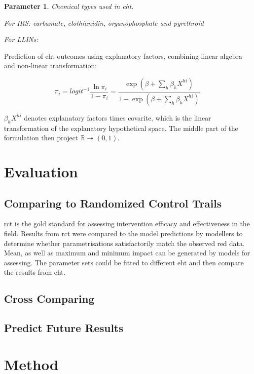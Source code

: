 \documentclass[a4paper, 12pt, twoside]{article}
\newtheorem{parameter}{Parameter}
\begin{document}
\begin{parameter}
\label{eht:chemical_class_used}
  Chemical types used in \gls{eht}.

  For IRS: carbamate, clothianidin, organophosphate and pyrethroid

  For LLINs: 
  
\end{parameter}

Prediction of \gls{eht} outcomes using explanatory factors, combining linear algebra and non-linear transformation\cite{Sherrard-Smith2018b}:

\[
  \pi_i = logit^{-1} \frac{\ln \pi_i}{1-\pi_i} = \frac{ \exp( \beta + \sum_h \beta_h X^{hi} ) }{ 1 - \exp( \beta + \sum_h \beta_h X^{hi} ) }
.\] 

$\beta_h X^{hi}$ denotes explanatory factors times covarite, which is the linear transformation of the explanatory hypothetical space. The middle part of the formulation then project $\mathbb{R} \twoheadrightarrow (0,1)$.

\section{Evaluation}
\subsection{Comparing to Randomized Control Trails}

\gls{rct} is the gold standard for assessing intervention efficacy and effectiveness in the field.
Results from \gls{rct} were compared to the model predictions by modellers to determine whether parametrisations satisfactorily match the observed red data\cite{Sherrard-Smith2018b}.
Mean, as well as maximum and minimum impact can be generated by models for assessing.
The parameter sets could be fitted to different \gls{eht} and then compare the results from \gls{eht}.

\subsection{Cross Comparing}
\subsection{Predict Future Results}

\section{Method}%
\label{sec:method}
\end{document}
